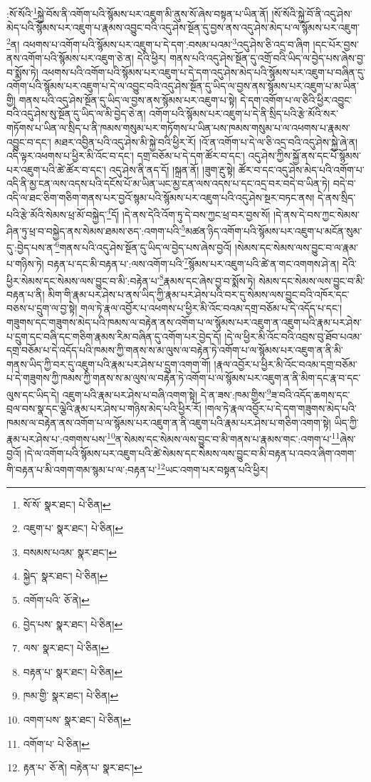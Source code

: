 :སོ་སོའི་\footnote{སོ་སོ་  སྣར་ཐང་།  པེ་ཅིན། }སྐྱེ་བོས་ནི་འགོག་པའི་སྙོམས་པར་འཇུག་མི་ནུས་སོ་ཞེས་བསྟན་པ་ཡིན་ནོ། །སོ་སོའི་སྐྱེ་བོ་ནི་འདུ་ཤེས་མེད་པའི་སྙོམས་པར་འཇུག་པ་རྣམས་འབྱུང་བའི་འདུ་ཤེས་སྔོན་དུ་བྱས་ནས་འདུ་ཤེས་མེད་པ་ལ་སྙོམས་པར་འཇུག་\footnote{འཇུག་པ་  སྣར་ཐང་།  པེ་ཅིན། }ན། འཕགས་པ་འགོག་པའི་སྙོམས་པར་འཇུག་པ་དེ་དག་:བསམ་པའམ་\footnote{བསམས་པའམ་  སྣར་ཐང་། }འདུ་ཤེས་ཅི་འདྲ་བ་ཞིག །དང་པོར་བྱས་ནས་འགོག་པའི་སྙོམས་པར་འཇུག་ཅེ་ན། དེའི་ཕྱིར། གནས་པའི་འདུ་ཤེས་སྔོན་དུ་འགྲོ་བའི་ཡིད་ལ་བྱེད་པས་ཞེས་བྱ་བ་སྨོས་ཏེ། འཕགས་པའི་འགོག་པའི་སྙོམས་པར་འཇུག་པ་དེ་དག་འདུ་ཤེས་མེད་པའི་སྙོམས་པར་འཇུག་པ་བཞིན་དུ་འགོག་པའི་སྙོམས་པར་འཇུག་པ་དེ་ལ་འབྱུང་བའི་འདུ་ཤེས་སྔོན་དུ་ཡིད་ལ་བྱས་ནས་སྙོམས་པར་འཇུག་པ་མ་ཡིན་གྱི། གནས་པའི་འདུ་ཤེས་སྔོན་དུ་ཡིད་ལ་བྱས་ནས་སྙོམས་པར་འཇུག་པ་སྟེ། དེ་དག་འགོག་པ་ལ་ཅིའི་ཕྱིར་འབྱུང་བའི་འདུ་ཤེས་སུ་སྔོན་དུ་ཡིད་ལ་མི་བྱེད་ཅེ་ན། འགོག་པའི་སྙོམས་པར་འཇུག་པ་དེ་ནི་སྲིད་པའི་རྩེ་མོའི་སར་གཏོགས་པ་ཡིན་ལ་སྲིད་པ་ནི་ཁམས་གསུམ་པར་གཏོགས་པ་ཡིན་པས་ཁམས་གསུམ་པ་ལ་འཕགས་པ་རྣམས་འབྱུང་བ་དང་། མཐར་འབྱིན་པའི་འདུ་ཤེས་མི་སྐྱེ་བའི་ཕྱིར་རོ། །འོ་ན་འགོག་པ་དེ་ལ་ཅི་འདྲ་བའི་འདུ་ཤེས་སྐྱེ་ཞེ་ན། འདི་ལྟར་འཕགས་པ་ཕྱིར་མི་འོང་བ་དང་། དགྲ་བཅོམ་པ་དེ་དག་ཚོར་བ་དང་། འདུ་ཤེས་ཀྱིས་སྐྱོ་ནས་དང་པོ་སྙོམས་པར་འཇུག་པའི་ཚེ་ཚོར་བ་དང་། འདུ་ཤེས་ནི་ནད་དོ། །སྐྲན་ནོ། །ཟུག་རྔུ་སྟེ། ཚོར་བ་དང་འདུ་ཤེས་མེད་པའི་འགོག་པ་འདི་ནི་མྱ་ངན་ལས་འདས་པའི་དངོས་པོ་མ་ཡིན་ཡང་མྱ་ངན་ལས་འདས་པ་དང་འདྲ་བར་བདེ་བ་ཡིན་ཏེ། བདེ་བ་འདི་ལ་ཐང་ཅིག་གཅིག་གནས་པར་བྱའོ་སྙམ་པའི་སྙོམས་པར་འཇུག་པའི་འདུ་ཤེས་སྔར་བཏང་ནས། དེ་ནས་སྲིད་པའི་རྩེ་མོའི་སེམས་ཕྲ་མོ་བསྐྱེད་\footnote{སྐྱེད་  སྣར་ཐང་།  པེ་ཅིན། }དོ། །དེ་ནས་དེའི་འོག་ཏུ་དེ་བས་ཀྱང་ཕྲ་བར་བྱས་སོ། །དེ་ནས་དེ་བས་ཀྱང་སེམས་ཤིན་ཏུ་ཕྲ་བ་བསྐྱེད་ནས་སེམས་ཐམས་ཅད་:འགག་པའི་\footnote{འགོག་པའི་  ཅོ་ནེ། }མཚན་ཉིད་འགོག་པའི་སྙོམས་པར་འཇུག་པ་མངོན་སུམ་དུ་:བྱེད་པས་ན་\footnote{བྱེད་པས་  སྣར་ཐང་།  པེ་ཅིན། }གནས་པའི་འདུ་ཤེས་སྔོན་དུ་ཡིད་ལ་བྱེད་པས་ཞེས་བྱའོ། །སེམས་དང་སེམས་ལས་བྱུང་བ་ལ་རྣམ་པ་གཉིས་ཏེ། བརྟན་པ་དང་མི་བརྟན་པ་:ལས་འགོག་པའི་\footnote{ལས་  སྣར་ཐང་།  པེ་ཅིན། }སྙོམས་པར་འཇུག་པའི་ཚེ་ན་གང་འགགས་ཤེ་ན། དེའི་ཕྱིར་སེམས་དང་སེམས་ལས་བྱུང་བ་མི་:བརྟེན་པ་\footnote{བརྟན་པ་  སྣར་ཐང་།  པེ་ཅིན། }རྣམས་དང་ཞེས་བྱ་བ་སྨོས་ཏེ། སེམས་དང་སེམས་ལས་བྱུང་བ་མི་བརྟན་པ་ནི། མིག་གི་རྣམ་པར་ཤེས་པ་ནས་ཡིད་ཀྱི་རྣམ་པར་ཤེས་པའི་བར་དུ་སེམས་ལས་བྱུང་བའི་འཁོར་དང་བཅས་པ་དྲུག་ལ་བྱ་སྟེ། གལ་ཏེ་རྣལ་འབྱོར་པ་འཕགས་པ་ཕྱིར་མི་འོང་བའམ་དགྲ་བཅོམ་པ་དེ་འདོད་པ་དང་། གཟུགས་དང་གཟུགས་མེད་པའི་ཁམས་ལ་བརྟེན་ནས་འགོག་པ་ལ་སྙོམས་པར་འཇུག་ན་འཇུག་པའི་རྣམ་པར་ཤེས་པ་དྲུག་དང་བཞི་དང་གཅིག་རྣམས་རིམ་བཞིན་དུ་འགོག་པར་བྱེད་དོ། །དེ་ལ་ཕྱིར་མི་འོང་བའི་འབྲས་བུ་ཐོབ་པའམ་དགྲ་བཅོམ་པ་དེ་འདོད་པའི་ཁམས་ཀྱི་གནས་ས་མ་ལུས་ལ་བརྟེན་ཏེ་འགོག་པ་ལ་སྙོམས་པར་འཇུག་ན་ནི་མི་གནས་ཡིད་ཀྱི་བར་དུ་འཇུག་པའི་རྣམ་པར་ཤེས་པ་དྲུག་འགག་གོ། །རྣལ་འབྱོར་པ་ཕྱིར་མི་འོང་བའམ་དགྲ་བཅོམ་པ་དེ་གཟུགས་ཀྱི་ཁམས་ཀྱི་གནས་ས་མ་ལུས་ལ་བརྟེན་ཏེ་འགོག་པ་ལ་སྙོམས་པར་འཇུག་ན་ནི་མིག་དང་རྣ་བ་དང་ལུས་དང་ཡིད་དེ། འཇུག་པའི་རྣམ་པར་ཤེས་པ་བཞི་འགག་སྟེ། དེ་ན་ཟས་:ཁམ་གྱིས་\footnote{ཁམ་གྱི་  སྣར་ཐང་།  པེ་ཅིན། }ཟ་བའི་འདོད་ཆགས་དང་བྲལ་བས་སྣ་དང་ལྕེའི་རྣམ་པར་ཤེས་པ་གཉིས་མེད་པའི་ཕྱིར་རོ། །གལ་ཏེ་རྣལ་འབྱོར་པ་དེ་དག་གཟུགས་མེད་པའི་ཁམས་ལ་བརྟེན་ནས་འགོག་པ་ལ་སྙོམས་པར་འཇུག་ན་ནི་འཇུག་པའི་རྣམ་པར་ཤེས་པ་གཅིག་འགག་སྟེ། ཡིད་ཀྱི་རྣམ་པར་ཤེས་པ་:འགགས་པས་\footnote{འགག་པས་  སྣར་ཐང་།  པེ་ཅིན། }ན་སེམས་དང་སེམས་ལས་བྱུང་བ་མི་གནས་པ་རྣམས་གང་:འགག་པ་\footnote{འགོག་པ་  པེ་ཅིན། }ཞེས་བྱའོ། །དེ་ལ་འགོག་པའི་སྙོམས་པར་འཇུག་པའི་ཚེ་སེམས་དང་སེམས་ལས་བྱུང་བ་མི་བརྟན་པ་འབའ་ཞིག་འགག་གི་བརྟན་པ་མི་འགག་གམ་སྙམ་པ་ལ་:བརྟན་པ་\footnote{རྟན་པ་  ཅོ་ནེ། བརྟེན་པ་  སྣར་ཐང་། }ཡང་འགག་པར་བསྟན་པའི་ཕྱིར། 
